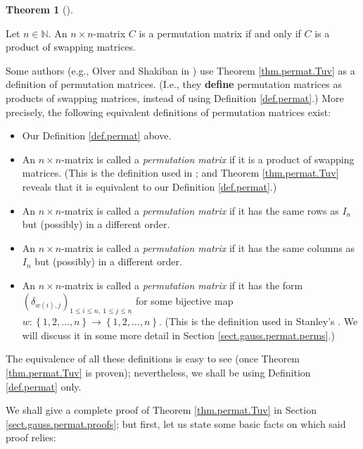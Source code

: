 \documentclass[numbers=enddot,12pt,final,onecolumn,notitlepage]{scrartcl}%
\theoremstyle{definition}
\newtheorem{theo}{Theorem}[section]
\newenvironment{theorem}[1][]
{\begin{theo}[#1]\begin{leftbar}}
{\end{leftbar}\end{theo}}
\begin{document}
\begin{theorem}
\label{thm.permat.Tuv}Let $n\in\mathbb{N}$. An $n\times n$-matrix $C$ is a
permutation matrix if and only if $C$ is a product of swapping matrices.
\end{theorem}

Some authors (e.g., Olver and Shakiban in \cite[Chapter 1, Definition
1.8]{OlvSha06}) use Theorem \ref{thm.permat.Tuv} as a definition of
permutation matrices. (I.e., they \textbf{define} permutation matrices as
products of swapping matrices, instead of using Definition \ref{def.permat}.)
More precisely, the following equivalent definitions of permutation matrices exist:

\begin{itemize}
\item Our Definition \ref{def.permat} above.

\item An $n\times n$-matrix is called a \textit{permutation matrix} if it is a
product of swapping matrices. (This is the definition used in \cite[Chapter 1,
Definition 1.8]{OlvSha06}; and Theorem \ref{thm.permat.Tuv} reveals that it is
equivalent to our Definition \ref{def.permat}.)

\item An $n\times n$-matrix is called a \textit{permutation matrix} if it has
the same rows as $I_{n}$ but (possibly) in a different order.

\item An $n\times n$-matrix is called a \textit{permutation matrix} if it has
the same columns as $I_{n}$ but (possibly) in a different order.

\item An $n\times n$-matrix is called a \textit{permutation matrix} if it has
the form $\left(  \delta_{w\left(  i\right)  ,j}\right)  _{1\leq i\leq
n,\ 1\leq j\leq n}$ for some bijective map $w:\left\{  1,2,\ldots,n\right\}
\rightarrow\left\{  1,2,\ldots,n\right\}  $. (This is the definition used in
Stanley's \cite[\S 1.5]{Stanley-EC1}. We will discuss it in some more detail
in Section \ref{sect.gauss.permat.perms}.)
\end{itemize}

The equivalence of all these definitions is easy to see (once Theorem
\ref{thm.permat.Tuv} is proven); nevertheless, we shall be using Definition
\ref{def.permat} only.

We shall give a complete proof of Theorem \ref{thm.permat.Tuv} in Section
\ref{sect.gauss.permat.proofs}; but first, let us state some basic facts on
which said proof relies:
\end{document}
